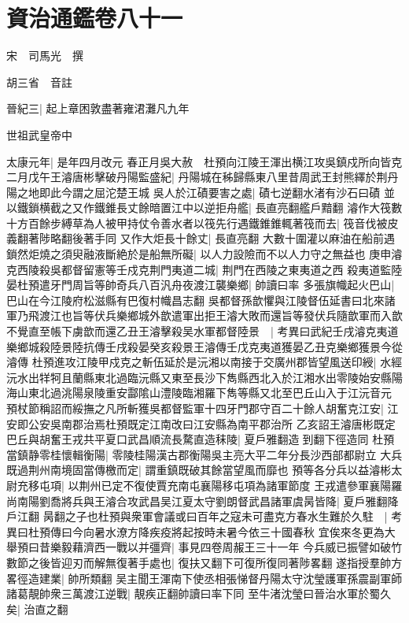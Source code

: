 \chapter{資治通鑑卷八十一}
宋　司馬光　撰

胡三省　音註

晉紀三|{
	起上章困敦盡著雍涒灘凡九年}


世祖武皇帝中

太康元年|{
	是年四月改元}
春正月吳大赦　杜預向江陵王渾出横江攻吳鎮戍所向皆克二月戊午王濬唐彬擊破丹陽監盛紀|{
	丹陽城在秭歸縣東八里昔周武王封熊繹於荆丹陽之地即此今謂之屈沱楚王城}
吳人於江磧要害之處|{
	磧七逆翻水渚有沙石曰磧}
並以鐵鎖横截之又作鐵錐長丈餘暗置江中以逆拒舟艦|{
	長直亮翻艦戶黯翻}
濬作大筏數十方百餘步縛草為人被甲持仗令善水者以筏先行遇鐵錐錐輒著筏而去|{
	筏音伐被皮義翻著陟略翻後著手同}
又作大炬長十餘丈|{
	長直亮翻}
大數十圍灌以麻油在船前遇鎖然炬燒之須臾融液斷絶於是船無所礙|{
	以人力設險而不以人力守之無益也}
庚申濬克西陵殺吳都督留憲等壬戍克荆門夷道二城|{
	荆門在西陵之東夷道之西}
殺夷道監陸晏杜預遣牙門周旨等帥奇兵八百汎舟夜渡江襲樂鄉|{
	帥讀曰率}
多張旗幟起火巴山|{
	巴山在今江陵府松滋縣有巴復村幟昌志翻}
吳都督孫歆懼與江陵督伍延書曰北來諸軍乃飛渡江也旨等伏兵樂鄉城外歆遣軍出拒王濬大敗而還旨等發伏兵隨歆軍而入歆不覺直至帳下虜歆而還乙丑王濬擊殺吴水軍都督陸景　|{
	考異曰武紀壬戌濬克夷道樂鄉城殺陸景陸抗傳壬戌殺晏癸亥殺景王濬傳壬戊克夷道獲晏乙丑克樂鄉獲景今從濬傳}
杜預進攻江陵甲戍克之斬伍延於是沅湘以南接于交廣州郡皆望風送印綬|{
	水經沅水出䍧牱且蘭縣東北過臨沅縣又東至長沙下雋縣西北入於江湘水出零陵始安縣陽海山東北過洮陽泉陵重安酃隂山澧陵臨湘羅下雋等縣又北至巴丘山入于江沅音元}
預杖節稱詔而綏撫之凡所斬獲吳都督監軍十四牙門郡守百二十餘人胡奮克江安|{
	江安即公安吳南郡治焉杜預既定江南改曰江安縣為南平郡治所}
乙亥詔王濬唐彬既定巴丘與胡奮王戎共平夏口武昌順流長騖直造秣陵|{
	夏戶雅翻造到翻下徑造同}
杜預當鎮静零桂懷輯衡陽|{
	零陵桂陽漢古郡衡陽吳主亮大平二年分長沙西部都尉立}
大兵既過荆州南境固當傳檄而定|{
	謂重鎮既破其餘當望風而靡也}
預等各分兵以益濬彬太尉充移屯項|{
	以荆州已定不復使賈充南屯襄陽移屯項為諸軍節度}
王戎遣參軍襄陽羅尚南陽劉喬將兵與王濬合攻武昌吴江夏太守劉朗督武昌諸軍虞昺皆降|{
	夏戶雅翻降戶江翻}
昺翻之子也杜預與衆軍會議或曰百年之寇未可盡克方春水生難於久駐　|{
	考異曰杜預傳曰今向暑水潦方降疾疫將起按時未暑今依三十國春秋}
宜俟來冬更為大舉預曰昔樂毅藉濟西一戰以并彊齊|{
	事見四卷周赧王三十一年}
今兵威已振譬如破竹數節之後皆迎刃而解無復著手處也|{
	復扶又翻下可復所復同著陟畧翻}
遂指授羣帥方畧徑造建業|{
	帥所類翻}
吴主聞王渾南下使丞相張悌督丹陽太守沈瑩護軍孫震副軍師諸葛靚帥衆三萬渡江逆戰|{
	靚疾正翻帥讀曰率下同}
至牛渚沈瑩曰晉治水軍於蜀久矣|{
	治直之翻}
